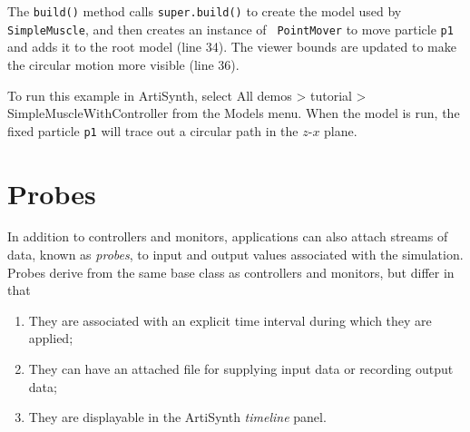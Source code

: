 The {\tt build()} method calls {\tt super.build()} to create the model
used by {\tt SimpleMuscle}, and then creates an instance of {\tt
PointMover} to move particle {\tt p1} and adds it to the root model
(line 34). The viewer bounds are updated to make the circular motion
more visible (line 36).

To run this example in ArtiSynth, select {\sf All demos > tutorial >
SimpleMuscleWithController} from the {\sf Models} menu. When
the model is run, the fixed particle {\tt p1} will trace
out a circular path in the $z$-$x$ plane.

\section{Probes}
\label{Probes:sec}

In addition to controllers and monitors, applications can also attach
streams of data, known as {\it probes}, to input and output values
associated with the simulation. Probes derive from the same base class
 as 
controllers and monitors, 
but differ in that 

\begin{enumerate}

\item They are associated with an explicit time interval during which
they are applied;

\item They can have an attached file for supplying input data or
recording output data;

\item They are displayable in the ArtiSynth {\it timeline} panel.

\end{enumerate}

